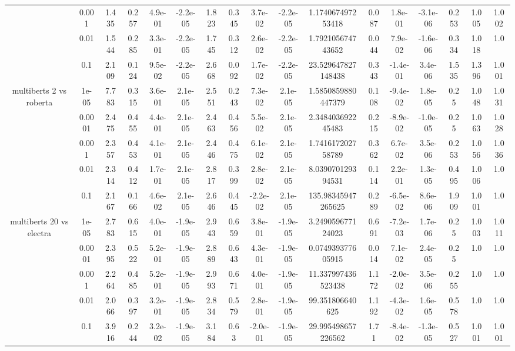 \begin{tabular}{|c|c|c|c|c|c|c|c|c|c|c|c|c|c|c|c|c|}
 & 0.001 & 1.435 & 0.257 & 4.9e-01 & -2.2e-05 & 1.823 & 0.345 & 3.7e-02 & -2.2e-05 & 1.174067497253418 & 0.087 & 1.8e-01 & -3.1e-06 & 0.253 & 1.005 & 1.002 \\
 & 0.01 & 1.544 & 0.285 & 3.3e-01 & -2.2e-05 & 1.745 & 0.312 & 2.6e-02 & -2.2e-05 & 1.792105674743652 & 0.044 & 7.9e-02 & -1.6e-06 & 0.334 & 1.018 & 1.0 \\
 & 0.1 & 2.109 & 0.124 & 9.5e-02 & -2.2e-05 & 2.668 & 0.092 & 1.7e-02 & -2.2e-05 & 23.529647827148438 & 0.343 & -1.4e-01 & 3.4e-06 & 1.535 & 1.396 & 1.001 \\
\hline
\multirow{5}{*}{multiberts 2 vs roberta } & 1e-05 & 7.783 & 0.315 & 3.6e-01 & 2.1e-05 & 2.551 & 0.243 & 7.3e-02 & 2.1e-05 & 1.5850859880447379 & 0.108 & -9.4e-02 & 1.8e-05 & 0.25 & 1.048 & 1.031 \\
 & 0.0001 & 2.475 & 0.455 & 4.4e-01 & 2.1e-05 & 2.463 & 0.456 & 5.5e-02 & 2.1e-05 & 2.348403692245483 & 0.215 & -8.9e-02 & -1.0e-05 & 0.25 & 1.063 & 1.028 \\
 & 0.001 & 2.357 & 0.453 & 4.1e-01 & 2.1e-05 & 2.446 & 0.475 & 6.1e-02 & 2.1e-05 & 1.741617202758789 & 0.362 & 6.7e-02 & 3.5e-06 & 0.253 & 1.056 & 1.036 \\
 & 0.01 & 2.314 & 0.412 & 1.7e-01 & 2.1e-05 & 2.817 & 0.399 & 2.8e-02 & 2.1e-05 & 8.039070129394531 & 0.114 & 2.2e-01 & 1.3e-05 & 0.495 & 1.006 & 1.0 \\
 & 0.1 & 2.167 & 0.166 & 4.6e-02 & 2.1e-05 & 2.646 & 0.445 & -2.2e-02 & 2.1e-05 & 135.98345947265625 & 0.289 & -6.5e-02 & 8.6e-06 & 1.909 & 1.001 & 1.0 \\
\hline
\multirow{5}{*}{multiberts 20 vs electra } & 1e-05 & 2.783 & 0.615 & 4.0e-01 & -1.9e-05 & 2.943 & 0.659 & 3.8e-01 & -1.9e-05 & 3.249059677124023 & 0.691 & -7.2e-03 & 1.7e-06 & 0.25 & 1.003 & 1.011 \\
 & 0.0001 & 2.395 & 0.522 & 5.2e-01 & -1.9e-05 & 2.889 & 0.643 & 4.3e-01 & -1.9e-05 & 0.074939377605915 & 0.014 & 7.1e-02 & 2.4e-05 & 0.25 & 1.0 & 1.0 \\
 & 0.001 & 2.264 & 0.485 & 5.2e-01 & -1.9e-05 & 2.993 & 0.671 & 4.0e-01 & -1.9e-05 & 11.337997436523438 & 1.172 & -2.0e-02 & 3.5e-06 & 0.255 & 1.0 & 1.0 \\
 & 0.01 & 2.066 & 0.397 & 3.2e-01 & -1.9e-05 & 2.834 & 0.579 & 2.8e-01 & -1.9e-05 & 99.351806640625 & 1.192 & -4.3e-02 & 1.6e-05 & 0.578 & 1.0 & 1.0 \\
 & 0.1 & 3.916 & 0.244 & 3.2e-02 & -1.9e-05 & 3.184 & 0.63 & -2.0e-01 & -1.9e-05 & 29.995498657226562 & 1.71 & -8.4e-02 & -1.3e-05 & 0.527 & 1.001 & 1.001 \\

\end{tabular}

